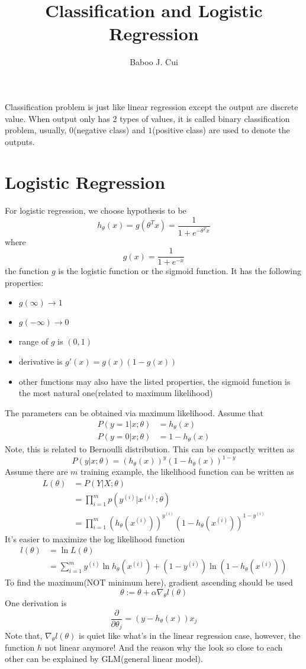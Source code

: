 \documentclass[10pt,a4paper,oneside]{article}
\author{Baboo J. Cui}
\begin{document}
\title{Classification and Logistic Regression}
\maketitle

Classification problem is just like linear regression except the output are discrete value. When output only has 2 types of values, it is called binary classification problem, usually, $0$(negative class) and $1$(positive class) are used to denote the outputs.

\section{Logistic Regression}
For logistic regression, we choose hypothesis to be
\[
h_\theta (x) = g(\theta^T x) = \frac{1}{1 + e^{-\theta^T x}}
\]
where 
\[
g(x) = \frac{1}{1+e^{-x}}
\]
the function $g$ is the logistic function or the sigmoid function. It has the following properties:
\begin{itemize}
	\item $g(\infty) \rightarrow 1$
	\item $g(-\infty) \rightarrow 0$
	\item range of $g$ is $(0, 1)$
	\item derivative is  $g'(x) = g(x)(1-g(x))$
	\item other functions may also have the listed properties, the sigmoid function is the most natural one(related to maximum likelihood)
\end{itemize}
The parameters can be obtained via maximum likelihood. Assume that
\begin{align*}
P(y = 1 | x; \theta) &= h_\theta(x)\\
P(y = 0 | x; \theta) &= 1 - h_\theta(x)
\end{align*}
Note, this is related to Bernoulli distribution. This can be compactly written as
\[
P(y|x; \theta) = (h_\theta(x))^y(1 - h_\theta(x))^{1-y}
\]
Assume there are $m$ training example, the likelihood function can be written as
\begin{align*}
L(\theta) &= P(Y | X; \theta)\\
&= \prod_{i=1}^{m} p(y^{(i)}|x^{(i)};\theta)\\
&= \prod_{i=1}^{m} (h_\theta(x^{(i)}))^{y^{(i)}}(1 - h_\theta(x^{(i)}))^{1-y^{(i)}}
\end{align*}
It's easier to maximize the log likelihood function
\begin{align*}
l(\theta) &= \ln L(\theta)\\
&= \sum_{i=1}^{m} y^{(i)}\ln h_\theta(x^{(i)}) + (1-y^{(i)}) \ln(1- h_\theta(x^{(i)}) )
\end{align*}
To find the maximum(NOT minimum here), gradient ascending should be used
\[
\theta := \theta + \alpha\nabla_\theta l(\theta)
\]
One derivation is
\[
\frac{\partial}{\partial \theta_j} = (y - h_\theta(x))x_j
\]
Note that, $\nabla_\theta l(\theta)$ is quiet like what's in the linear regression case, however, the function $h$ not linear anymore! And the reason why the look so close to each other can be explained by GLM(general linear model).
\end{document}
